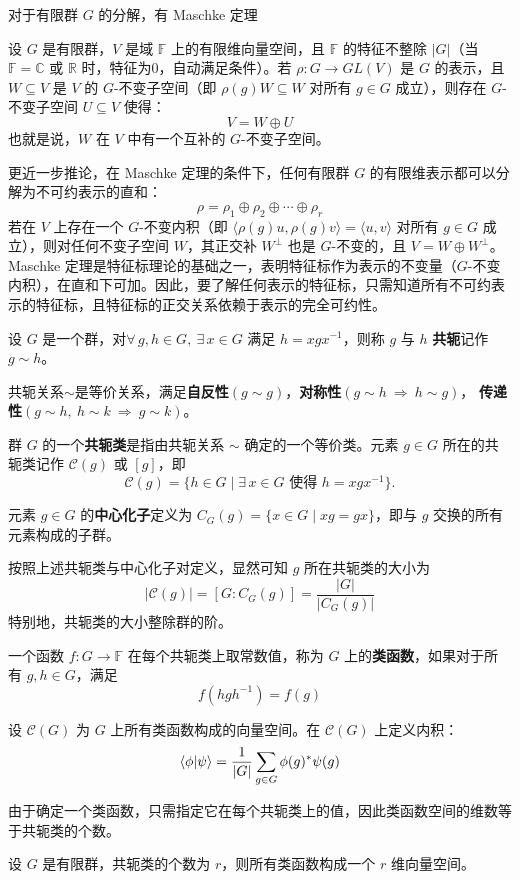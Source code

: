 对于有限群 $G$ 的分解，有 Maschke 定理
\begin{theorem}[Maschke 定理]
设 $G$ 是有限群，$V$ 是域 $\mathbb{F}$ 上的有限维向量空间，且 $\mathbb{F}$ 的特征不整除 $|G|$（当 $\mathbb{F}=\mathbb{C}$ 或 $\mathbb{R}$ 时，特征为0，自动满足条件）。若 $\rho: G \to GL(V)$ 是 $G$ 的表示，且 $W \subseteq V$ 是 $V$ 的 $G$-不变子空间（即 $\rho(g)W \subseteq W$ 对所有 $g \in G$ 成立），则存在 $G$-不变子空间 $U \subseteq V$ 使得：
\[V = W \oplus U\]
也就是说，$W$ 在 $V$ 中有一个互补的 $G$-不变子空间。
\end{theorem}
更近一步推论，在 Maschke 定理的条件下，任何有限群 $G$ 的有限维表示都可以分解为不可约表示的直和：
\[\rho = \rho_1 \oplus \rho_2 \oplus \cdots \oplus \rho_r\]
若在 $V$ 上存在一个 $G$-不变内积（即 $\langle \rho(g)u, \rho(g)v \rangle = \langle u, v \rangle$ 对所有 $g \in G$ 成立），则对任何不变子空间 $W$，其正交补 $W^\perp$ 也是 $G$-不变的，且 $V = W \oplus W^\perp$。Maschke 定理是特征标理论的基础之一，表明特征标作为表示的不变量（$G$-不变内积），在直和下可加。因此，要了解任何表示的特征标，只需知道所有不可约表示的特征标，且特征标的正交关系依赖于表示的完全可约性。

\begin{definition}[共轭关系]
设 $G$ 是一个群，对$\forall \, g, h \in G, \ \exists \, x \in G$ 满足 $h = x g x^{-1}$，则称 $g$ 与 $h$ \textbf{共轭}记作 $g \sim h$。
\end{definition}
共轭关系$\sim$是等价关系，满足\textbf{自反性}$(g \sim g)$，\textbf{对称性}$(g \sim h \ \Rightarrow \ h \sim g)$， \textbf{传递性}$(g \sim h, \ h \sim k \ \Rightarrow \ g \sim k)$。

\begin{definition}[共轭类]
群 $G$ 的一个\textbf{共轭类}是指由共轭关系 $\sim$ 确定的一个等价类。元素 $g \in G$ 所在的共轭类记作 $\mathcal{C}(g)$ 或 $[g]$，即
\[\mathcal{C}(g) = \{ h \in G \mid \exists \, x \in G \text{ 使得 } h = x g x^{-1} \}.\]
\end{definition}

\begin{definition}[中心化子]
元素 $g \in G$ 的\textbf{中心化子}定义为 $C_G(g) = \{ x \in G \mid x g = g x \}$，即与 $g$ 交换的所有元素构成的子群。
\end{definition}
按照上述共轭类与中心化子对定义，显然可知 $g$ 所在共轭类的大小为
\[|\mathcal{C}(g)| = [G : C_G(g)] = \frac{|G|}{|C_G(g)|}\]
特别地，共轭类的大小整除群的阶。

\begin{definition}[类函数]
一个函数 $f: G \to \mathbb{F}$ 在每个共轭类上取常数值，称为 $G$ 上的\textbf{类函数}，如果对于所有 $g, h \in G$，满足
\[f(h g h^{-1}) = f(g)\]
\end{definition}
\begin{definition}[类函数空间]
设 $\mathcal{C}(G)$ 为 $G$ 上所有类函数构成的向量空间。在 $\mathcal{C}(G)$ 上定义内积：
\[\bra{\phi}\ket{\psi} = \frac{1}{|G|} \sum_{g \in G} \phi(g)^*\psi(g)\]
\end{definition}
由于确定一个类函数，只需指定它在每个共轭类上的值，因此类函数空间的维数等于共轭类的个数。
\begin{theorem}
设 $G$ 是有限群，共轭类的个数为 $r$，则所有类函数构成一个 $r$ 维向量空间。
\end{theorem}

